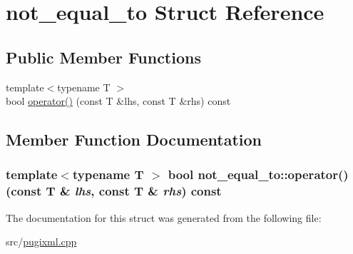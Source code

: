 \hypertarget{structnot__equal__to}{
\section{not\_\-equal\_\-to Struct Reference}
\label{structnot__equal__to}
}
\subsection*{Public Member Functions}
\begin{DoxyCompactItemize}
\item 
{\footnotesize template$<$typename T $>$ }\\bool \hyperlink{structnot__equal__to_a003bf0d318c9d21b8c7f767fb83dc016}{operator()} (const T \&lhs, const T \&rhs) const 
\end{DoxyCompactItemize}


\subsection{Member Function Documentation}
\hypertarget{structnot__equal__to_a003bf0d318c9d21b8c7f767fb83dc016}{
\subsubsection[{operator()}]{\setlength{\rightskip}{0pt plus 5cm}template$<$typename T $>$ bool not\_\-equal\_\-to::operator() (const T \& {\em lhs}, \/  const T \& {\em rhs}) const}}
\label{structnot__equal__to_a003bf0d318c9d21b8c7f767fb83dc016}


The documentation for this struct was generated from the following file:\begin{DoxyCompactItemize}
\item 
src/\hyperlink{pugixml_8cpp}{pugixml.cpp}\end{DoxyCompactItemize}

